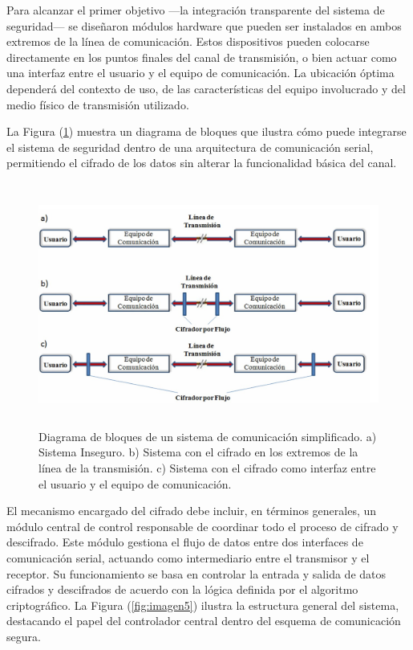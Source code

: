 Para alcanzar el primer objetivo —la integración transparente del sistema de seguridad— se diseñaron módulos hardware que pueden ser instalados en ambos extremos de la línea de comunicación. Estos dispositivos pueden colocarse directamente en los puntos finales del canal de transmisión, o bien actuar como una interfaz entre el usuario y el equipo de comunicación. La ubicación óptima dependerá del contexto de uso, de las características del equipo involucrado y del medio físico de transmisión utilizado.

La Figura (\ref{fig:imagen4}) muestra un diagrama de bloques que ilustra cómo puede integrarse el sistema de seguridad dentro de una arquitectura de comunicación serial, permitiendo el cifrado de los datos sin alterar la funcionalidad básica del canal.

\begin{figure}[h!] %
    \centering %
     \includegraphics[width=1\textwidth, height=8cm]{imagenes/img4} %
    \caption{Diagrama de bloques de un sistema de comunicación simplificado. a) Sistema Inseguro. 
b) Sistema con el cifrado en los extremos de la línea de la transmisión. c) Sistema con el cifrado 
como interfaz entre el usuario y el  equipo de comunicación. }
    \label{fig:imagen4} %
\end{figure} 

El mecanismo encargado del cifrado debe incluir, en términos generales, un módulo central de control responsable de coordinar todo el proceso de cifrado y descifrado. Este módulo gestiona el flujo de datos entre dos interfaces de comunicación serial, actuando como intermediario entre el transmisor y el receptor. Su funcionamiento se basa en controlar la entrada y salida de datos cifrados y descifrados de acuerdo con la lógica definida por el algoritmo criptográfico. La Figura (\ref{fig:imagen5}) ilustra la estructura general del sistema, destacando el papel del controlador central dentro del esquema de comunicación segura.

